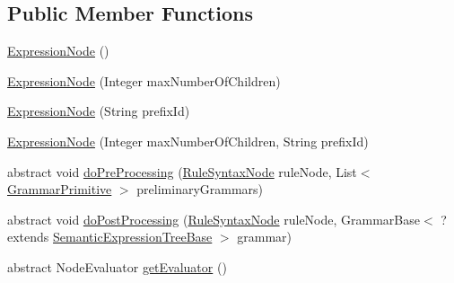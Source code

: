 \subsection*{Public Member Functions}
\begin{DoxyCompactItemize}
\item 
\hyperlink{classit_1_1emarolab_1_1cagg_1_1core_1_1language_1_1syntax_1_1expressionTree_1_1ExpressionNode_3_3eaf7c0f6a4bc47f4823e05ca883c5af_acfac8736e19e954def3e135de75d668e}{Expression\-Node} ()
\item 
\hyperlink{classit_1_1emarolab_1_1cagg_1_1core_1_1language_1_1syntax_1_1expressionTree_1_1ExpressionNode_3_3eaf7c0f6a4bc47f4823e05ca883c5af_afceb671682d5571c86e9d0fe88cbec01}{Expression\-Node} (Integer max\-Number\-Of\-Children)
\item 
\hyperlink{classit_1_1emarolab_1_1cagg_1_1core_1_1language_1_1syntax_1_1expressionTree_1_1ExpressionNode_3_3eaf7c0f6a4bc47f4823e05ca883c5af_ac4c34516c636386f44d4ced73cd40161}{Expression\-Node} (String prefix\-Id)
\item 
\hyperlink{classit_1_1emarolab_1_1cagg_1_1core_1_1language_1_1syntax_1_1expressionTree_1_1ExpressionNode_3_3eaf7c0f6a4bc47f4823e05ca883c5af_afd7160581088741847d7c0cef6a12034}{Expression\-Node} (Integer max\-Number\-Of\-Children, String prefix\-Id)
\item 
abstract void \hyperlink{classit_1_1emarolab_1_1cagg_1_1core_1_1language_1_1syntax_1_1expressionTree_1_1ExpressionNode_3_3eaf7c0f6a4bc47f4823e05ca883c5af_a4c135dd47fca43bfe195c65d5badb432}{do\-Pre\-Processing} (\hyperlink{classit_1_1emarolab_1_1cagg_1_1core_1_1language_1_1syntax_1_1abstractTree_1_1syntaxNodeType_1_1RuleSyntaxNode}{Rule\-Syntax\-Node} rule\-Node, List$<$ \hyperlink{classit_1_1emarolab_1_1cagg_1_1core_1_1language_1_1syntax_1_1GrammarPrimitive}{Grammar\-Primitive} $>$ preliminary\-Grammars)
\item 
abstract void \hyperlink{classit_1_1emarolab_1_1cagg_1_1core_1_1language_1_1syntax_1_1expressionTree_1_1ExpressionNode_3_3eaf7c0f6a4bc47f4823e05ca883c5af_abb0958efc3259484dd3f8c81e3341658}{do\-Post\-Processing} (\hyperlink{classit_1_1emarolab_1_1cagg_1_1core_1_1language_1_1syntax_1_1abstractTree_1_1syntaxNodeType_1_1RuleSyntaxNode}{Rule\-Syntax\-Node} rule\-Node, Grammar\-Base$<$ ?extends \hyperlink{interfaceit_1_1emarolab_1_1cagg_1_1core_1_1evaluation_1_1semanticGrammar_1_1syntaxCompiler_1_1SemanticExpressionTreeBase}{Semantic\-Expression\-Tree\-Base} $>$ grammar)
\item 
abstract Node\-Evaluator \hyperlink{classit_1_1emarolab_1_1cagg_1_1core_1_1language_1_1syntax_1_1expressionTree_1_1ExpressionNode_3_3eaf7c0f6a4bc47f4823e05ca883c5af_a6a0c26d674d8cbef1fc2b3ae214c5dcf}{get\-Evaluator} ()

\end{DoxyCompactItemize}
